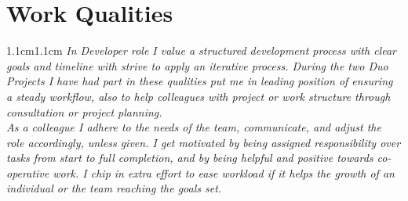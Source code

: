 \documentclass[10pt,a4paper]{article}
\begin{document}
\section{Work Qualities}
\begin{adjustwidth}{1.1cm}{1.1cm}
{\mono\selectfont
\color{white}
\fontsize{11}{13}\selectfont
\emph{%
In Developer role I value a structured development process with clear goals and timeline with strive to apply an iterative process.
During the two Duo Projects I have had part in these qualities put me in leading position of ensuring a steady workflow, also
to help colleagues with project or work structure through consultation or project planning.\\[0.4cm]
As a colleague I adhere to the needs of the team, communicate, and adjust the role accordingly, unless given. I get motivated by being assigned responsibility over tasks
from start to full completion, and by being helpful and positive towards co-operative work. I chip in extra effort to ease workload if it helps the growth of an individual or the team reaching the goals set.}
}
\end{adjustwidth}
\end{document}
